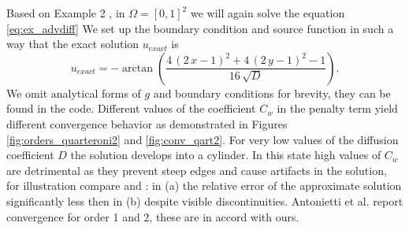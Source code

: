 \begin{example}
\label{ex:quart2}
Based on Example 2 \cite{Antonietti2013},
in $\Omega = [0, 1 ]^2$ we will again solve the equation \eqref{eq:ex_advdiff}
We set up the boundary condition and source function in such a way that the exact
solution $u_{exact}$ is
\begin{equation}
	u_{exact} =  -\arctan\left(\frac{4 \, {\left(2 \, x - 1\right)}^{2} + 4 \, {\left(2
	\, y - 1\right)}^{2} -
	1}{16 \, \sqrt{\mathit{D}}}\right).
\end{equation}
We omit analytical forms of $g$ and boundary conditions for brevity, they can be found in
the code. Different values of the coefficient $C_w$ in the penalty term yield different
convergence behavior as demonstrated in Figures \ref{fig:orders_quarteroni2} and 
\ref{fig:conv_qart2}. For very low values of the diffusion coefficient $D$ the
solution develops into a cylinder. In this state high values of $C_w$ are detrimental as
they prevent steep edges and cause artifacts in the solution, for illustration compare
 and : in (a) the relative error of
the approximate solution significantly less then in (b) despite visible discontinuities.
Antonietti et al. \cite{Antonietti2013} report convergence for order 1 and 2, these are
in accord with ours.


\end{example}
